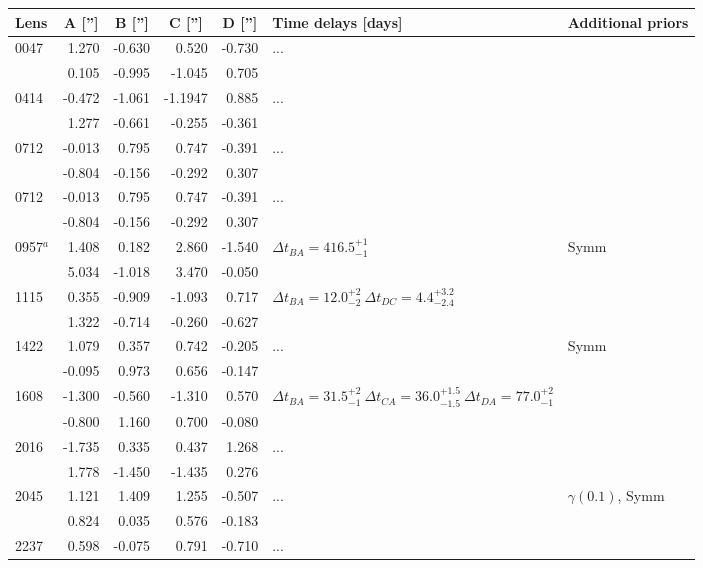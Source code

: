 \documentclass[useAMS,usenatbib]{mn2e}
\begin{document}
\begin{table}
  \begin{center}
    \begin{tabular}{l r r r r l l}
      Lens    & \multicolumn{1}{c}{A ['']} & \multicolumn{1}{c}{B ['']} & \multicolumn{1}{c}{C ['']} & \multicolumn{1}{c}{D ['']} & Time delays [days] & Additional priors \\ \hline
      0047 & 1.270 & -0.630 & 0.520 & -0.730 & ... & \\
           & 0.105 & -0.995 & -1.045 & 0.705 & &  \\
      0414 & -0.472 & -1.061 & -1.1947 & 0.885 & ... & \\
           & 1.277 & -0.661 & -0.255 & -0.361 & &  \\
      0712 & -0.013 & 0.795 & 0.747 & -0.391 & ... & \\
           & -0.804 & -0.156 & -0.292 & 0.307 & &  \\
      0712 & -0.013 & 0.795 & 0.747 & -0.391 & ... & \\
           & -0.804 & -0.156 & -0.292 & 0.307 &  &  \\
      0957$^{a}$ & 1.408 & 0.182 & 2.860 & -1.540 & $\Delta t_{BA}=416.5^{+1}_{-1}$ & Symm \\
           & 5.034 & -1.018 & 3.470 & -0.050 &  &  \\
      1115 & 0.355 & -0.909 & -1.093 & 0.717 & $\Delta t_{BA}=12.0^{+2}_{-2} \ \Delta t_{DC}=4.4^{+3.2}_{-2.4}$ & \\
           & 1.322 & -0.714 & -0.260 & -0.627 & &  \\
      1422 & 1.079 & 0.357 & 0.742 & -0.205 & ... & Symm \\
           & -0.095 & 0.973 & 0.656 & -0.147 &  &  \\
      1608 & -1.300 & -0.560 & -1.310 & 0.570 & $\Delta t_{BA}=31.5^{+2}_{-1} \ \Delta t_{CA}=36.0^{+1.5}_{-1.5} \ \Delta t_{DA}=77.0^{+2}_{-1}$ & \\
           & -0.800 & 1.160 & 0.700 & -0.080 &  &  \\
      2016 & -1.735 & 0.335 & 0.437 & 1.268 & ... & \\
           & 1.778 & -1.450 & -1.435 & 0.276 &  &  \\
      2045 & 1.121 & 1.409 & 1.255 & -0.507 & ... & $\gamma(0.1)$, Symm \\
           & 0.824 & 0.035 & 0.576 & -0.183 &  &  \\
      2237 & 0.598 & -0.075 & 0.791 & -0.710 & ... & \\

\end{tabular}
\end{center}
\end{table}
\end{document}
